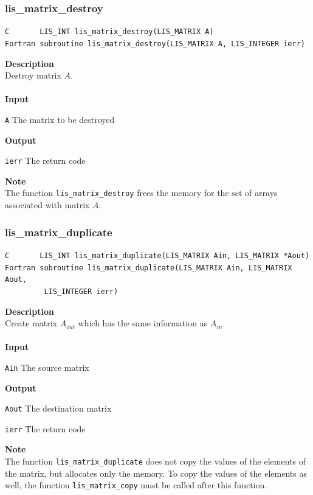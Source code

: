 \documentclass[a4paper]{article}
\newcommand{\namelistlabel}[1]{\mbox{#1}\hfill}
\newenvironment{namelist}[1]{%
\begin{list}{}
  {\let\makelabel\namelistlabel
  \settowidth{\labelwidth}{#1}
  \setlength{\leftmargin}{1.1\labelwidth}}
  }{%
\end{list}}
\begin{document}
\subsubsection{lis\_matrix\_destroy}
\begin{screen}
\verb|C       LIS_INT lis_matrix_destroy(LIS_MATRIX A)|\\
\verb|Fortran subroutine lis_matrix_destroy(LIS_MATRIX A, LIS_INTEGER ierr)|
\end{screen}
{\bf Description}\\
\indent
Destroy matrix $A$.
\\ \\
\noindent
{\bf Input}
\begin{namelist}{XXXXXXXXXXXXXXXXXXXX}
\item[\tt A] The matrix to be destroyed
\end{namelist}
{\bf Output}
\begin{namelist}{XXXXXXXXXXXXXXXXXXXX}
\item[\tt ierr] The return code
\end{namelist}
{\bf Note}\\
\indent
The function \verb|lis_matrix_destroy| frees the memory 
for the set of arrays associated with matrix $A$.

\newpage
\subsubsection{lis\_matrix\_duplicate}
\begin{screen}
\verb|C       LIS_INT lis_matrix_duplicate(LIS_MATRIX Ain, LIS_MATRIX *Aout)|
\verb|Fortran subroutine lis_matrix_duplicate(LIS_MATRIX Ain, LIS_MATRIX Aout,|\\
\verb|         LIS_INTEGER ierr)|
\end{screen}
{\bf Description}\\
\indent
Create matrix $A_{out}$ which has the same information as $A_{in}$.
\\ \\
\noindent
{\bf Input}
\begin{namelist}{XXXXXXXXXXXXXXXXXXXX}
\item[\tt Ain] The source matrix
\end{namelist}
{\bf Output}
\begin{namelist}{XXXXXXXXXXXXXXXXXXXX}
\item[\tt Aout] The destination matrix
\item[\tt ierr] The return code
\end{namelist}
{\bf Note}\\
\indent
The function \verb|lis_matrix_duplicate| does not copy the values of 
the elements of the matrix, but allocates only the memory. 
To copy the values of the elements as well, the function
\verb|lis_matrix_copy| must be called after this function.
\end{document}
